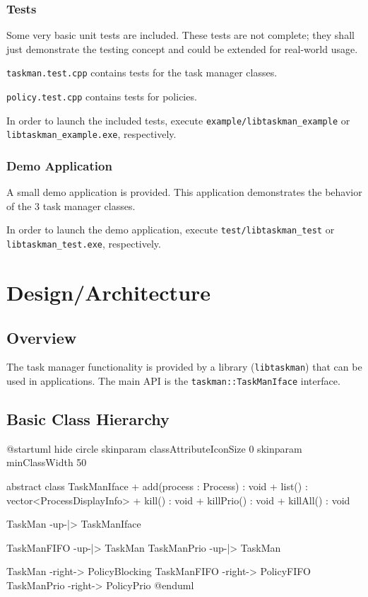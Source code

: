 \documentclass[a4paper]{scrartcl}
\begin{document}
\subsubsection{Tests}
Some very basic unit tests are included. These tests are not complete; they shall just demonstrate the testing concept and could be extended for real-world usage.

\texttt{taskman.test.cpp} contains tests for the task manager classes.

\texttt{policy.test.cpp} contains tests for policies.

In order to launch the included tests, execute \texttt{example/libtaskman_example} or\\ \texttt{libtaskman_example.exe}, respectively.

\subsubsection{Demo Application}
A small demo application is provided. This application demonstrates the behavior of the 3 task manager classes.

In order to launch the demo application, execute \texttt{test/libtaskman_test} or\\ \texttt{libtaskman_test.exe}, respectively.

\section{Design/Architecture}

\subsection{Overview}
The task manager functionality is provided by a library (\texttt{libtaskman}) that can be used in applications.
The main API is the \texttt{taskman::TaskManIface} interface.

\subsection{Basic Class Hierarchy}

\begin{plantuml}
@startuml
hide circle
skinparam classAttributeIconSize 0
skinparam minClassWidth 50

abstract  class TaskManIface {
+ add(process : Process) : void
+ list() : vector<ProcessDisplayInfo>
+ kill() : void
+ killPrio() : void
+ killAll() : void
}

TaskMan -up-|> TaskManIface

TaskManFIFO -up-|> TaskMan
TaskManPrio -up-|> TaskMan

TaskMan -right-> PolicyBlocking
TaskManFIFO -right-> PolicyFIFO
TaskManPrio -right-> PolicyPrio
@enduml
\end{plantuml}
\end{document}
